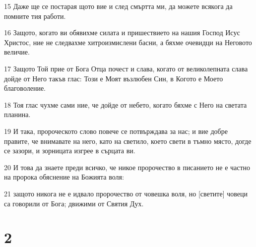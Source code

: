 \par 15 Даже ще се постарая щото вие и след смъртта ми, да можете всякога да помните тия работи.
\par 16 Защото, когато ви обявихме силата и пришествието на нашия Господ Исус Христос, ние не следвахме хитроизмислени басни, а бяхме очевидци на Неговото величие.
\par 17 Защото Той прие от Бога Отца почест и слава, когато от великолепната слава дойде от Него такъв глас: Този е Моят възлюбен Син, в Когото е Моето благоволение.
\par 18 Тоя глас чухме сами ние, че дойде от небето, когато бяхме с Него на светата планина.
\par 19 И така, пророческото слово повече се потвърждава за нас; и вие добре правите, че внимавате на него, като на светило, което свети в тъмно място, догде се зазори, и зорницата изгрее в сърцата ви.
\par 20 И това да знаете преди всичко, че никое пророчество в писанието не е частно на пророка обяснение на Божията воля:
\par 21 защото никога не е идвало пророчество от човешка воля, но [светите] човеци са говорили от Бога; движими от Святия Дух.

\chapter{2}

